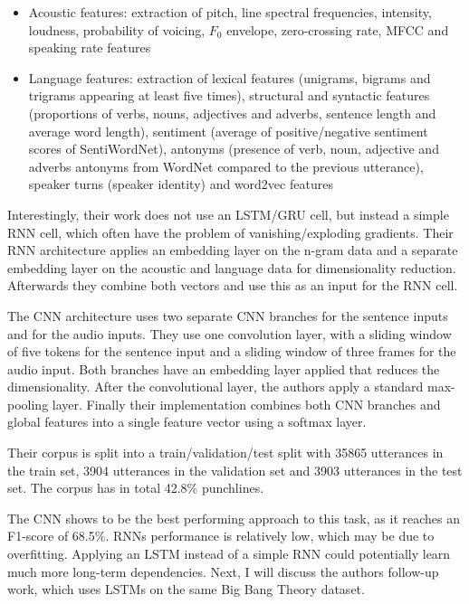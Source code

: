\documentclass[draft,final,oneside]{vutinfth} %
\begin{document}
\begin{itemize}
\item Acoustic features: extraction of pitch, line spectral frequencies, intensity, loudness, probability of voicing, $F_0$ envelope, zero-crossing rate, MFCC and speaking rate features
\item Language features: extraction of lexical features (unigrams, bigrams and trigrams appearing at least five times), structural and syntactic features (proportions of verbs, nouns, adjectives and adverbs, sentence length and average word length), sentiment (average of positive/negative sentiment scores of SentiWordNet), antonyms (presence of verb, noun, adjective and adverbs antonyms from WordNet compared to the previous utterance), speaker turns (speaker identity) and word2vec features \cite{wordnet}\cite{word2vec}
\end{itemize}

Interestingly, their work does not use an LSTM/GRU cell, but instead a simple RNN cell, which often have the problem of vanishing/exploding gradients. \cite{hochreiter} Their RNN architecture applies an embedding layer on the n-gram data and a separate embedding layer on the acoustic and language data for dimensionality reduction. Afterwards they combine both vectors and use this as an input for the RNN cell.

The CNN architecture uses two separate CNN branches for the sentence inputs and for the audio inputs. They use one convolution layer, with a sliding window of five tokens for the sentence input and a sliding window of three frames for the audio input. Both branches have an embedding layer applied that reduces the dimensionality. After the convolutional layer, the authors apply a standard max-pooling layer. Finally their implementation combines both CNN branches and global features into a single feature vector using a softmax layer.

Their corpus is split into a train/validation/test split with 35865 utterances in the train set, 3904 utterances in the validation set and 3903 utterances in the test set. The corpus has in total 42.8\% punchlines.

The CNN shows to be the best performing approach to this task, as it reaches an F1-score of 68.5\%. RNNs performance is relatively low, which may be due to overfitting. Applying an LSTM instead of a simple RNN could potentially learn much more long-term dependencies. Next, I will discuss the authors follow-up work, which uses LSTMs on the same Big Bang Theory dataset.
\end{document}
